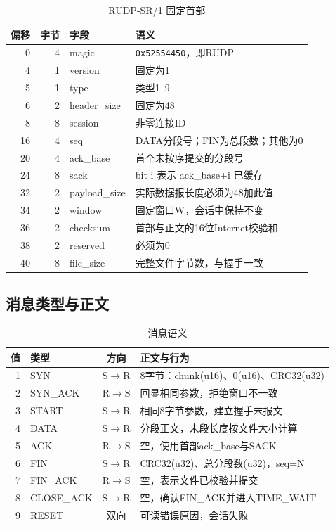 \documentclass[UTF8,notitlepage,11pt]{ctexart}
\newcommand{\src}[1]{\nolinkurl{#1}}
\begin{document}
\begin{table}[H]\centering\small\caption{RUDP-SR/1 固定首部}
\begin{tabularx}{\textwidth}{rrlX}\toprule
偏移 & 字节 & 字段 & 语义\\\midrule
0 & 4 & magic & \src{0x52554450}，即RUDP\\
4 & 1 & version & 固定为1\\
5 & 1 & type & 类型1--9\\
6 & 2 & header\_size & 固定为48\\
8 & 8 & session & 非零连接ID\\
16 & 4 & seq & DATA分段号；FIN为总段数；其他为0\\
20 & 4 & ack\_base & 首个未按序提交的分段号\\
24 & 8 & sack & bit i 表示 ack\_base+i 已缓存\\
32 & 2 & payload\_size & 实际数据报长度必须为48加此值\\
34 & 2 & window & 固定窗口W，会话中保持不变\\
36 & 2 & checksum & 首部与正文的16位Internet校验和\\
38 & 2 & reserved & 必须为0\\
40 & 8 & file\_size & 完整文件字节数，与握手一致\\\bottomrule
\end{tabularx}\end{table}

\subsection{消息类型与正文}
\begin{table}[H]\centering\small\caption{消息语义}
\begin{tabularx}{\textwidth}{rlcX}\toprule
值 & 类型 & 方向 & 正文与行为\\\midrule
1 & SYN & S$\to$R & 8字节：chunk(u16)、0(u16)、CRC32(u32)\\
2 & SYN\_ACK & R$\to$S & 回显相同参数，拒绝窗口不一致\\
3 & START & S$\to$R & 相同8字节参数，建立握手末报文\\
4 & DATA & S$\to$R & 分段正文，末段长度按文件大小计算\\
5 & ACK & R$\to$S & 空，使用首部ack\_base与SACK\\
6 & FIN & S$\to$R & CRC32(u32)、总分段数(u32)，seq=N\\
7 & FIN\_ACK & R$\to$S & 空，表示文件已校验并提交\\
8 & CLOSE\_ACK & S$\to$R & 空，确认FIN\_ACK并进入TIME\_WAIT\\
9 & RESET & 双向 & 可读错误原因，会话失败\\\bottomrule
\end{tabularx}\end{table}
\end{document}
